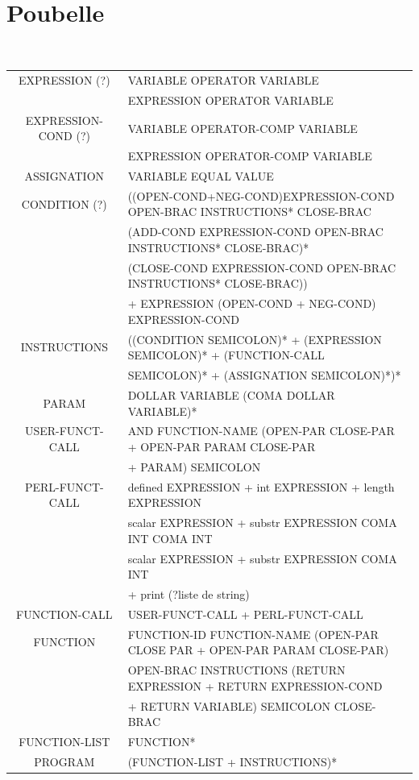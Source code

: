 \documentclass[a4paper,10pt]{article}
\begin{document}
~\\
















\section{Poubelle}





~\\
\pagebreak
\hspace{-4.5cm}\begin{tabular}{|c|l|}
\hline
EXPRESSION (?)		& VARIABLE OPERATOR VARIABLE   \\
					& EXPRESSION OPERATOR VARIABLE \\ \hline
EXPRESSION-COND (?)	& VARIABLE OPERATOR-COMP VARIABLE   \\
					& EXPRESSION OPERATOR-COMP VARIABLE \\ \hline
ASSIGNATION			& VARIABLE EQUAL VALUE \\ \hline
CONDITION (?)		& ((OPEN-COND+NEG-COND)EXPRESSION-COND OPEN-BRAC INSTRUCTIONS* CLOSE-BRAC\\
					& (ADD-COND EXPRESSION-COND OPEN-BRAC INSTRUCTIONS* CLOSE-BRAC)* \\
					& (CLOSE-COND EXPRESSION-COND OPEN-BRAC INSTRUCTIONS* CLOSE-BRAC))\\
					& + EXPRESSION (OPEN-COND + NEG-COND) EXPRESSION-COND \\ \hline
INSTRUCTIONS		& ((CONDITION SEMICOLON)* + (EXPRESSION SEMICOLON)* + (FUNCTION-CALL \\ 
					& SEMICOLON)* + (ASSIGNATION SEMICOLON)*)* \\ \hline
PARAM				& DOLLAR VARIABLE (COMA DOLLAR VARIABLE)* \\ \hline
USER-FUNCT-CALL		& AND FUNCTION-NAME (OPEN-PAR CLOSE-PAR + OPEN-PAR PARAM CLOSE-PAR  \\
					& + PARAM) SEMICOLON \\ \hline
PERL-FUNCT-CALL		& defined EXPRESSION + int EXPRESSION + length EXPRESSION \\ 
					& scalar EXPRESSION + substr EXPRESSION COMA INT COMA INT \\
					& scalar EXPRESSION + substr EXPRESSION COMA INT  \\
					& + print (?liste de string) \\ \hline
FUNCTION-CALL		& USER-FUNCT-CALL + PERL-FUNCT-CALL \\ \hline
FUNCTION			& FUNCTION-ID FUNCTION-NAME (OPEN-PAR CLOSE PAR + OPEN-PAR PARAM CLOSE-PAR) \\
					& OPEN-BRAC INSTRUCTIONS (RETURN EXPRESSION + RETURN EXPRESSION-COND \\
					& + RETURN VARIABLE) SEMICOLON CLOSE-BRAC \\ \hline
FUNCTION-LIST		& FUNCTION* \\ \hline
PROGRAM				& (FUNCTION-LIST + INSTRUCTIONS)*\\ \hline


\end{tabular}
\end{document}
